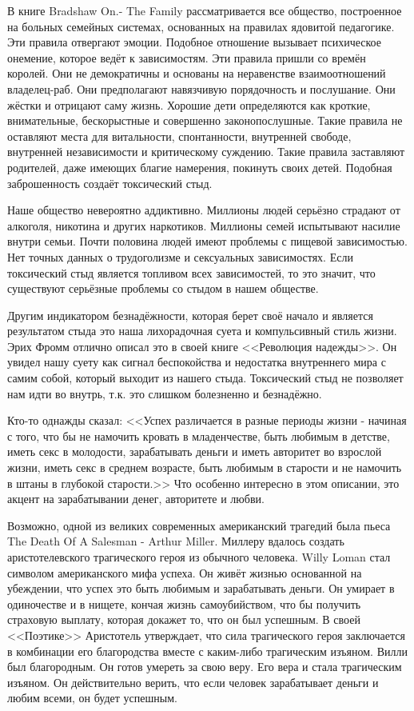 \documentclass[10pt, fleqn]{article}
\begin{document}

В книге Bradshaw On.- The Family рассматривается все общество, построенное на больных семейных системах, основанных на правилах ядовитой педагогике. Эти правила отвергают эмоции. Подобное отношение вызывает психическое онемение, которое ведёт к зависимостям. Эти правила пришли со времён королей. Они не демократичны и основаны на неравенстве взаимоотношений владелец-раб. Они предполагают навязчивую порядочность и послушание. Они жёстки и отрицают саму жизнь. Хорошие дети определяются как кроткие, внимательные, бескорыстные и совершенно законопослушные. Такие правила не оставляют места для витальности, спонтанности, внутренней свободе, внутренней независимости и критическому суждению. Такие правила заставляют родителей, даже имеющих благие намерения, покинуть своих детей. Подобная заброшенность создаёт токсический стыд.


Наше общество невероятно аддиктивно. Миллионы людей серьёзно страдают от алкоголя, никотина и других наркотиков. Миллионы семей испытывают насилие внутри семьи. Почти половина людей имеют проблемы с пищевой зависимостью. Нет точных данных о трудоголизме и сексуальных зависимостях. Если токсический стыд является топливом всех зависимостей, то это значит, что существуют серьёзные проблемы со стыдом в нашем обществе.

Другим индикатором безнадёжности, которая берет своё начало и является результатом стыда это наша лихорадочная суета и компульсивный стиль жизни. Эрих Фромм отлично описал это в своей книге <<Революция надежды>>. Он увидел нашу суету как сигнал беспокойства и недостатка внутреннего мира с самим собой, который выходит из нашего стыда. Токсический стыд не позволяет нам идти во внутрь, т.к. это слишком болезненно и безнадёжно.


Кто-то однажды сказал: <<Успех различается в разные периоды жизни - начиная с того, что бы не намочить кровать в младенчестве, быть любимым в детстве, иметь секс в молодости, зарабатывать деньги и иметь авторитет во взрослой жизни, иметь секс в среднем возрасте, быть любимым в старости и не намочить в штаны в глубокой старости.>> Что особенно интересно в этом описании, это акцент на зарабатывании денег, авторитете и любви.

Возможно, одной из великих современных американский трагедий была пьеса The Death Of A Salesman - Arthur Miller. Миллеру вдалось создать аристотелевского трагического героя из обычного человека. Willy Loman стал символом американского мифа успеха. Он живёт жизнью основанной на убеждении, что успех это быть любимым и зарабатывать деньги. Он умирает в одиночестве и в нищете, кончая жизнь самоубийством, что бы получить страховую выплату, которая докажет то, что он был успешным. В своей <<Поэтике>> Аристотель утверждает, что сила трагического героя заключается в комбинации его благородства вместе с каким-либо трагическим изъяном. Вилли был благородным. Он готов умереть за свою веру. Его вера и стала трагическим изъяном. Он действительно верить, что если человек зарабатывает деньги и любим всеми, он будет успешным.
\end{document}
